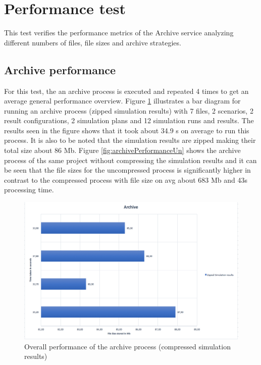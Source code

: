 \section{Performance test}
This test verifies the performance metrics of the Archive service analyzing different numbers of files, file sizes and archive strategies.

\subsection{Archive performance}
For this test, the an archive process is executed and repeated 4 times to get an average general performance overview. Figure \ref{fig:archivePerformance} illustrates a bar diagram for running an archive process (zipped simulation results) with 7 files, 2 scenarios, 2 result configurations, 2 simulation plans
and 12 simulation runs and results. The results seen in the figure shows that it took about 34.9 s on average to run this process. It is also to be noted that the
simulation results are zipped making their total size about 86 Mb. Figure \ref{fig:archivePerformanceUn} shows the archive process of ths same project without 
compressing the simulation results and it can be seen that the file sizes for the uncompressed process is significantly higher in contrast to the compressed
process with file size on avg about 683 Mb and 43s processing time.

\begin{figure}[H]
    \centering \includegraphics[scale=0.5]{grafiken/archiveZip.png}
    \caption{Overall performance of the archive process (compressed simulation results)}
    \label{fig:archivePerformance}
\end{figure}

